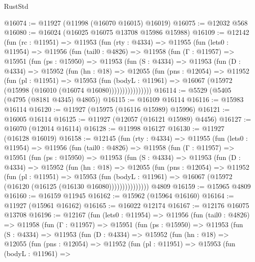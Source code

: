 \begin{lexlean}{RustStd}
\begin{coremodule}
@16074 := @11927 (@11998 (@16070 @16015) @16019)
@16075 := @12032 @568
@16080 := @16024 (@16025 @16075 @13708 @15986 @15988)
@16109 := @12142
    (fun (rc : @11951) =>
    @11953
      (fun (rty : @4334) =>
      @11955
        (fun (lets0 : @11954) =>
        @11956
          (fun (tail0 : @4826) =>
          @11958
            (fun (Γ : @11957) =>
            @15951
              (fun (ps : @15950) =>
              @11953
                (fun (S : @4334) =>
                @11953
                  (fun (D : @4334) =>
                  @15952
                    (fun (hn : @18) =>
                    @12055
                      (fun (pns : @12054) =>
                      @11952
                        (fun (pl : @11951) =>
                        @15953
                          (fun (bodyL : @11961) =>
                          @16067 (@15972 (@15998 (@16010 (@16074 @16080))))))))))))))))
@16114 := @5529 (@5405 (@4795 (@8181 @4345) @4805))
@16115 := @16109 @16114
@16116 := @15983 @16114
@16120 := @11927 (@15975 (@16116 @15989) @15996)
@16121 := @16005 @16114
@16125 := @11927 (@12057 (@16121 @15989) @4456)
@16127 := @16070 (@12014 @16114)
@16128 := @11998 @16127
@16130 := @11927 (@16128 @16019)
@16158 := @12145
    (fun (rty : @4334) =>
    @11955
      (fun (lets0 : @11954) =>
      @11956
        (fun (tail0 : @4826) =>
        @11958
          (fun (Γ : @11957) =>
          @15951
            (fun (ps : @15950) =>
            @11953
              (fun (S : @4334) =>
              @11953
                (fun (D : @4334) =>
                @15952
                  (fun (hn : @18) =>
                  @12055
                    (fun (pns : @12054) =>
                    @11952
                      (fun (pl : @11951) =>
                      @15953
                        (fun (bodyL : @11961) =>
                        @16067 (@15972 (@16120 (@16125 (@16130 @16080)))))))))))))))
    @4809
@16159 := @15965 @4809
@16160 := @16159 @11945
@16162 := @15962 (@15964 @16160)
@16164 := @11927 (@15961 @16162)
@16165 := @16022 @12174
@16167 := @12176 @16075 @13708
@16196 := @12167
    (fun (lets0 : @11954) =>
    @11956
      (fun (tail0 : @4826) =>
      @11958
        (fun (Γ : @11957) =>
        @15951
          (fun (ps : @15950) =>
          @11953
            (fun (S : @4334) =>
            @11953
              (fun (D : @4334) =>
              @15952
                (fun (hn : @18) =>
                @12055
                  (fun (pns : @12054) =>
                  @11952
                    (fun (pl : @11951) =>
                    @15953
                      (fun (bodyL : @11961) =>

\end{coremodule}
\end{lexlean}
